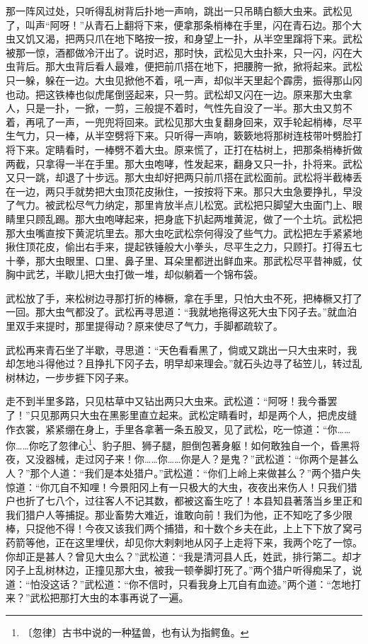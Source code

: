 \documentclass[12pt,UTF-8,openany]{ctexbook}
\begin{document}
\begin{normalsize}
    那一阵风过处，只听得乱树背后扑地一声响，跳出一只吊睛白额大虫来。武松见了，叫声“阿呀！”从青石上翻将下来，便拿那条梢棒在手里，闪在青石边。那个大虫又饥又渴，把两只爪在地下略按一按，和身望上一扑，从半空里蹿将下来。武松被那一惊，酒都做冷汗出了。说时迟，那时快，武松见大虫扑来，只一闪，闪在大虫背后。那大虫背后看人最难，便把前爪搭在地下，把腰胯一掀，掀将起来。武松只一躲，躲在一边。大虫见掀他不着，吼一声，却似半天里起个霹雳，振得那山冈也动。把这铁棒也似虎尾倒竖起来，只一剪。武松却又闪在一边。原来那大虫拿人，只是一扑，一掀，一剪，三般提不着时，气性先自没了一半。那大虫又剪不着，再吼了一声，一兜兜将回来。武松见那大虫复翻身回来，双手轮起梢棒，尽平生气力，只一棒，从半空劈将下来。只听得一声响，簌簌地将那树连枝带叶劈脸打将下来。定睛看时，一棒劈不着大虫。原来慌了，正打在枯树上，把那条梢棒折做两截，只拿得一半在手里。那大虫咆哮，性发起来，翻身又只一扑，扑将来。武松又只一跳，却退了十步远。那大虫却好把两只前爪搭在武松面前。武松将半截棒丢在一边，两只手就势把大虫顶花皮揪住，一按按将下来。那只大虫急要挣扎，早没了气力。被武松尽气力纳定，那里肯放半点儿松宽。武松把只脚望大虫面门上、眼睛里只顾乱踢。那大虫咆哮起来，把身底下扒起两堆黄泥，做了一个土坑。武松把那大虫嘴直按下黄泥坑里去。那大虫吃武松奈何得没了些气力。武松把左手紧紧地揪住顶花皮，偷出右手来，提起铁锤般大小拳头，尽平生之力，只顾打。打得五七十拳，那大虫眼里、口里、鼻子里、耳朵里都迸出鲜血来。那武松尽平昔神威，仗胸中武艺，半歇儿把大虫打做一堆，却似躺着一个锦布袋。
    
    武松放了手，来松树边寻那打折的棒橛，拿在手里，只怕大虫不死，把棒橛又打了一回。那大虫气都没了。武松再寻思道：“我就地拖得这死大虫下冈子去。”就血泊里双手来提时，那里提得动？原来使尽了气力，手脚都疏软了。
    
    武松再来青石坐了半歇，寻思道：“天色看看黑了，倘或又跳出一只大虫来时，我却怎地斗得他过？且挣扎下冈子去，明早却来理会。”就石头边寻了毡笠儿，转过乱树林边，一步步捱下冈子来。
    
    走不到半里多路，只见枯草中又钻出两只大虫来。武松道：“阿呀！我今番罢了！”只见那两只大虫在黑影里直立起来。武松定睛看时，却是两个人，把虎皮缝作衣裳，紧紧绷在身上，手里各拿著一条五股叉，见了武松，吃一惊道：“你……你……你吃了忽律心\footnote{〔忽律〕古书中说的一种猛兽，也有认为指鳄鱼。}、豹子胆、狮子腿，胆倒包著身躯！如何敢独自一个，昏黑将夜，又没器械，走过冈子来！你……你……你是人？是鬼？”武松道：“你两个是甚么人？”那个人道：“我们是本处猎户。”武松道：“你们上岭上来做甚么？”两个猎户失惊道：“你兀自不知哩！今景阳冈上有一只极大的大虫，夜夜出来伤人！只我们猎户也折了七八个，过往客人不记其数，都被这畜生吃了！本县知县著落当乡里正和我们猎户人等捕捉。那业畜势大难近，谁敢向前！我们为他，正不知吃了多少限棒，只捉他不得！今夜又该我们两个捕猎，和十数个乡夫在此，上上下下放了窝弓药箭等他，正在这里埋伏，却见你大剌剌地从冈子上走将下来，我两个吃了一惊。你却正是甚人？曾见大虫么？”武松道：“我是清河县人氏，姓武，排行第二。却才冈子上乱树林边，正撞见那大虫，被我一顿拳脚打死了。”两个猎户听得痴呆了，说道：“怕没这话？”武松道：“你不信时，只看我身上兀自有血迹。”两个道：“怎地打来？”武松把那打大虫的本事再说了一遍。
    

\end{normalsize}
\end{document}
